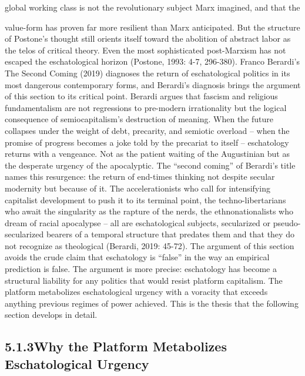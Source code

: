 global working class is not the revolutionary subject Marx imagined, and that the

value-form has proven far more resilient than Marx anticipated. But the structure of Postone’s thought still orients itself toward the abolition of abstract labor as the telos of critical theory. Even the most sophisticated post-Marxism has not escaped the eschatological horizon (Postone, 1993: 4-7, 296-380). Franco Berardi’s The Second Coming (2019) diagnoses the return of eschatological politics in its most dangerous contemporary forms, and Berardi’s diagnosis brings the argument of this section to its critical point. Berardi argues that fascism and religious fundamentalism are not regressions to pre-modern irrationality but the logical consequence of semiocapitalism’s destruction of meaning. When the future collapses under the weight of debt, precarity, and semiotic overload – when the promise of progress becomes a joke told by the precariat to itself – eschatology returns with a vengeance. Not as the patient waiting of the Augustinian but as the desperate urgency of the apocalyptic. The “second coming” of Berardi’s title names this resurgence: the return of end-times thinking not despite secular modernity but because of it. The accelerationists who call for intensifying capitalist development to push it to its terminal point, the techno-libertarians who await the singularity as the rapture of the nerds, the ethnonationalists who dream of racial apocalypse – all are eschatological subjects, secularized or pseudo-secularized bearers of a temporal structure that predates them and that they do not recognize as theological (Berardi, 2019: 45-72). The argument of this section avoids the crude claim that eschatology is “false” in the way an empirical prediction is false. The argument is more precise: eschatology has become a structural liability for any politics that would resist platform capitalism. The platform metabolizes eschatological urgency with a voracity that exceeds anything previous regimes of power achieved. This is the thesis that the following section develops in detail.

\subsection{5.1.3\quad Why the Platform Metabolizes Eschatological Urgency}

